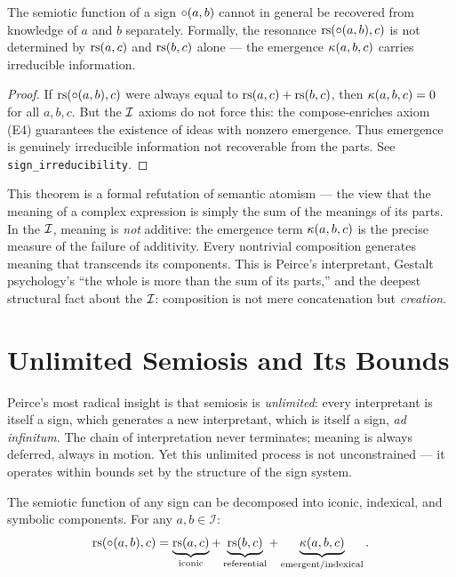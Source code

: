 \begin{theorem}
\label{thm:sign-irreducibility}
The semiotic function of a sign $\circ(a, b)$ cannot in general
be recovered from knowledge of $a$ and $b$ separately. Formally,
the resonance $\mathrm{rs}(\circ(a,b), c)$ is not determined by $\mathrm{rs}(a,c)$
and $\mathrm{rs}(b,c)$ alone --- the emergence $\kappa(a,b,c)$ carries
irreducible information.
\end{theorem}

\begin{proof}
If $\mathrm{rs}(\circ(a,b), c)$ were always equal to $\mathrm{rs}(a,c) + \mathrm{rs}(b,c)$,
then $\kappa(a,b,c) = 0$ for all $a, b, c$. But the $\mathcal{I}$ axioms do
not force this: the compose-enriches axiom (E4) guarantees the existence
of ideas with nonzero emergence. Thus emergence is genuinely irreducible
information not recoverable from the parts. See
\texttt{sign\_irreducibility}.
\end{proof}

\begin{interpretation}
This theorem is a formal refutation of semantic atomism --- the view
that the meaning of a complex expression is simply the sum of the
meanings of its parts. In the $\mathcal{I}$, meaning is \emph{not} additive:
the emergence term $\kappa(a, b, c)$ is the precise measure of the
failure of additivity. Every nontrivial composition generates meaning
that transcends its components. This is Peirce's interpretant,
Gestalt psychology's ``the whole is more than the sum of its parts,''
and the deepest structural fact about the $\mathcal{I}$: composition is not
mere concatenation but \emph{creation}.
\end{interpretation}

\section{Unlimited Semiosis and Its Bounds}

Peirce's most radical insight is that semiosis is \emph{unlimited}:
every interpretant is itself a sign, which generates a new interpretant,
which is itself a sign, \textit{ad infinitum}. The chain of
interpretation never terminates; meaning is always deferred, always
in motion. Yet this unlimited process is not unconstrained --- it
operates within bounds set by the structure of the sign system.

\begin{theorem}
\label{thm:semiotic-decomposition}
The semiotic function of any sign can be decomposed into iconic,
indexical, and symbolic components. For any $a, b \in \mathcal{I}$:
\[
  \mathrm{rs}(\circ(a, b), c) = \underbrace{\mathrm{rs}(a, c)}_{\text{iconic}}
  + \underbrace{\mathrm{rs}(b, c)}_{\text{referential}}
  + \underbrace{\kappa(a, b, c)}_{\text{emergent/indexical}}.
\]
\end{theorem}

